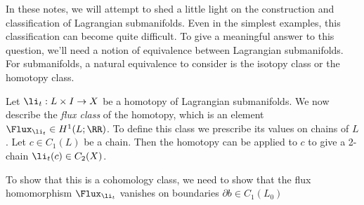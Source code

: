 
In these notes, we will attempt to shed a little light on the construction and classification of Lagrangian submanifolds. 
Even in the simplest examples, this classification can become quite difficult. 
To give a meaningful answer to this question, we'll need a notion of equivalence between Lagrangian submanifolds. 
For submanifolds, a natural equivalence to consider is the isotopy class or the homotopy class.

Let $\li_t: L\times I\to X$ be a homotopy of Lagrangian submanifolds.
We now describe the \emph{flux class} of the homotopy, which is an element $\Flux_{\li_t}\in H^1(L;\RR)$.
To define this class we prescribe its values on chains of $L$. 
Let $c\in C_1(L)$ be a chain. 
Then the homotopy can be applied to $c$ to give a 2-chain $\li_t(c)\in C_2(X)$. 

To show that this is a cohomology class, we need to show that the flux homomorphism $\Flux_{\li_t}$ vanishes on boundaries $\partial b\in C_1(L_0)$ 

